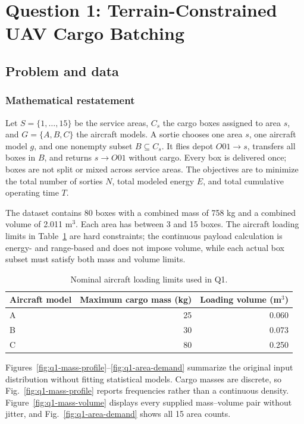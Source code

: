 \documentclass[11pt,a4paper]{article}
\begin{document}

\section{Question 1: Terrain-Constrained UAV Cargo Batching}
\subsection{Problem and data}
\subsubsection{Mathematical restatement}
Let $S=\{1,\ldots,15\}$ be the service areas, $C_s$ the cargo boxes assigned to area $s$, and $G=\{A,B,C\}$ the aircraft models. A sortie chooses one area $s$, one aircraft model $g$, and one nonempty subset $B\subseteq C_s$. It flies depot $O01\to s$, transfers all boxes in $B$, and returns $s\to O01$ without cargo. Every box is delivered once; boxes are not split or mixed across service areas. The objectives are to minimize the total number of sorties $N$, total modeled energy $E$, and total cumulative operating time $T$.

The dataset contains 80 boxes with a combined mass of 758 kg and a combined volume of 2.011 m$^3$. Each area has between 3 and 15 boxes. The aircraft loading limits in Table~\ref{tab:aircraft} are hard constraints; the continuous payload calculation is energy- and range-based and does not impose volume, while each actual box subset must satisfy both mass and volume limits.

\begin{table}[H]
\centering
\caption{Nominal aircraft loading limits used in Q1.}
\label{tab:aircraft}
\begin{tabular}{lrr}
\toprule
Aircraft model & Maximum cargo mass (kg) & Loading volume (m$^3$)\\
\midrule
A & 25 & 0.060\\
B & 30 & 0.073\\
C & 80 & 0.250\\
\bottomrule
\end{tabular}
\end{table}

Figures~\ref{fig:q1-mass-profile}--\ref{fig:q1-area-demand} summarize the original input distribution without fitting statistical models. Cargo masses are discrete, so Fig.~\ref{fig:q1-mass-profile} reports frequencies rather than a continuous density. Figure~\ref{fig:q1-mass-volume} displays every supplied mass--volume pair without jitter, and Fig.~\ref{fig:q1-area-demand} shows all 15 area counts.
\end{document}
